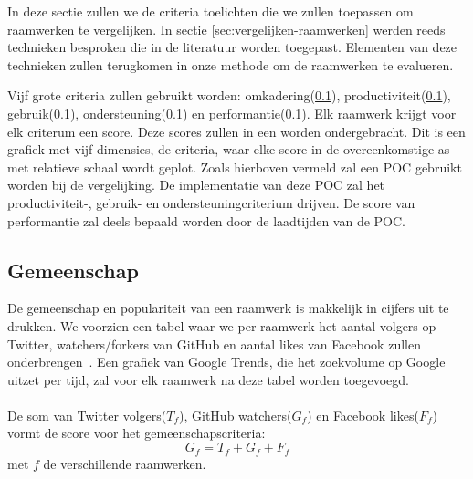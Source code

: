 In deze sectie zullen we de criteria toelichten die we zullen toepassen om raamwerken te vergelijken.
In sectie \ref{sec:vergelijken-raamwerken} werden reeds technieken besproken die in de literatuur worden toegepast.
Elementen van deze technieken zullen terugkomen in onze methode om de raamwerken te evalueren.

Vijf grote criteria zullen gebruikt worden:  omkadering(\ref{sec:vergelijking-gemeenschap}), productiviteit(\ref{sec:vergelijking-gemeenschap}), gebruik(\ref{sec:vergelijking-gemeenschap}), ondersteuning(\ref{sec:vergelijking-gemeenschap}) en performantie(\ref{sec:vergelijking-gemeenschap}). Elk raamwerk krijgt voor elk criterum een score. 
Deze scores zullen in een  worden ondergebracht.  
Dit is een grafiek met vijf dimensies,  de criteria,     waar elke score in de overeenkomstige as met relatieve schaal wordt geplot.
Zoals hierboven vermeld zal een POC gebruikt worden bij de vergelijking.
De implementatie van deze POC zal het productiviteit-, gebruik- en ondersteuningcriterium drijven.  
De score van performantie zal deels bepaald worden door de laadtijden van de POC.



\subsection{Gemeenschap}
\label{sec:vergelijking-gemeenschap}
De gemeenschap en populariteit van een raamwerk is makkelijk in cijfers uit te drukken. 
We voorzien een tabel waar we per raamwerk het aantal volgers op Twitter, watchers/forkers van GitHub en aantal likes van Facebook zullen onderbrengen~\cite{Sarrafi2012a,Ayuso2012}. 
Een grafiek van Google Trends, die het zoekvolume op Google uitzet per tijd, zal voor elk raamwerk na deze tabel worden toegevoegd.
\paragraph{}
De som van Twitter volgers($T_f$), GitHub watchers($G_f$) en Facebook likes($F_f$) vormt de score voor het gemeenschapscriteria:
\begin{equation}
  G_f={T_f+G_f+F_f}
  \label{eq:gemeenschap}
\end{equation}
met $f$ de verschillende raamwerken.

